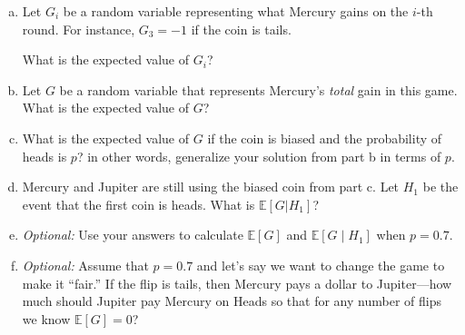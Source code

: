 \documentclass[12pt,letterpaper]{article}
\newenvironment{22enumerate}{\begin{enumerate}[a.]\itemsep0em}{\end{enumerate}}
\newif\ifsol
\newcommand{\solu}[2]{ \begin{mdframed} \ifsol #2 \else \vspace{#1} \fi \end{mdframed} }
\begin{document}
\begin{22enumerate}
    \item Let $G_i$ be a random variable representing what Mercury gains on the $i$-th round. For instance, $G_3=-1$ if the coin is tails.
    
    What is the expected value of $G_i$?
    \begin{mdframed} \vspace{1cm} \end{mdframed}

    \item Let $G$ be a random variable that represents Mercury's \textit{total} gain in this game. What is the expected value of $G$?
    \begin{mdframed} \vspace{1cm} \end{mdframed}
    
    \item What is the expected value of $G$ if the coin is biased and the probability of heads is $p$? in other words, generalize your solution from part b in terms of $p$.
    \begin{mdframed} \vspace{1cm} \end{mdframed}
    
    \item Mercury and Jupiter are still using the biased coin from part c. Let $H_1$ be the event that the first coin is heads. What is $\mathbb{E}[G| H_1]$?
    \begin{mdframed} \vspace{1cm} \end{mdframed}
    
    \item \textit{Optional:} Use your answers to calculate $\mathbb{E}[G]$ and $\mathbb{E}[G\mid H_1]$ when $p = 0.7$.
    \begin{mdframed} \vspace{1cm} \end{mdframed}
    \item \textit{Optional:} Assume that $p = 0.7$ and let's say we want to change the game to make it ``fair.'' If the flip is tails, then Mercury pays a dollar to Jupiter---how much should Jupiter pay Mercury on Heads so that for any number of flips we know $\mathbb{E}[G]=0$?
    \begin{mdframed} \vspace{1cm} \end{mdframed}
    
\end{22enumerate}
\end{document}
